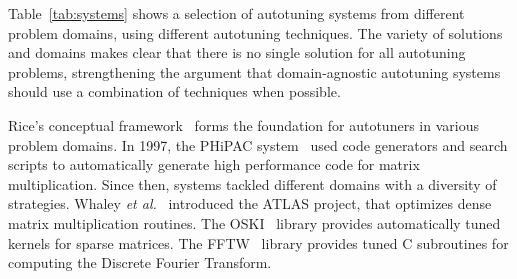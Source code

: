 Table~\ref{tab:systems} shows a selection of autotuning systems from different
problem domains, using different autotuning techniques. The variety of solutions
and domains makes clear that there is no single solution for all autotuning
problems, strengthening the argument that domain-agnostic autotuning systems
should use a combination of techniques when possible.

Rice's conceptual framework~\cite{rice1976algorithm} forms the foundation for
autotuners in various problem domains.  In 1997, the PHiPAC
system~\cite{bilmes1997optimizing} used code generators and search scripts to
automatically generate high performance code for matrix multiplication. Since
then, systems tackled different domains with a diversity of strategies. Whaley
\emph{et al.}~\cite{dongarra1998automatically} introduced the ATLAS project,
that optimizes dense matrix multiplication routines. The
OSKI~\cite{vuduc2005oski} library provides automatically tuned kernels for
sparse matrices. The FFTW~\cite{frigo1998fftw} library provides tuned C
subroutines for computing the Discrete Fourier Transform.

